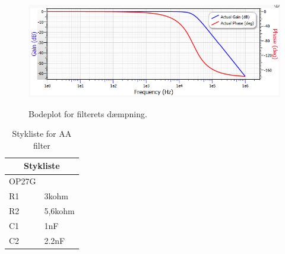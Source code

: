 \begin{figure}[H]
\centering
{\includegraphics[width=\linewidth]
{Figure/aafilterbode}}
\caption{Bodeplot for filterets dæmpning. }
\label{Fig:aafilterbode}
\end{figure} 


\begin{table}[H]
\centering
\caption{Stykliste for AA filter}
\label{Styklisteaafilter}
\begin{tabular}{|l|l|}
\hline
\multicolumn{2}{|c|}{\textbf{Stykliste}} \\ \hline
OP27G             &                    \\ \hline
R1             &         3kohm  			\\ \hline
R2             &           5,6kohm         \\ \hline
C1             &           1nF         \\ \hline
C2             &           2.2nF         \\ \hline

\end{tabular}
\end{table}

%
%
%
%
%
	
